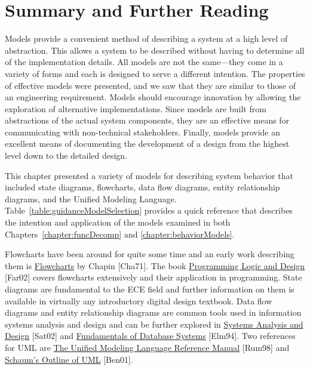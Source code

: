 \section{Summary and Further Reading}
\label{section:behavModelsSummary-and-further-reading}

Models provide a convenient method of describing a system at a high
level of abstraction. This allows a system to be described without
having to determine all of the implementation details. All models are
not the same---they come in a variety of forms and each is designed to
serve a different intention. The properties of effective models were
presented, and we saw that they are similar to those of an engineering
requirement. Models should encourage innovation by allowing the
exploration of alternative implementations. Since models are built from
abstractions of the actual system components, they are an effective
means for communicating with non-technical stakeholders. Finally, models
provide an excellent means of documenting the development of a design
from the highest level down to the detailed design.

This chapter presented a variety of models for describing system
behavior that included state diagrams, flowcharts, data flow diagrams,
entity relationship diagrams, and the Unified Modeling Language. 
Table~\ref{table:guidanceModelSelection}
provides a quick reference that describes the intention and
application of the models examined in both 
Chapters~\ref{chapter:funcDecomp} and \ref{chapter:behaviorModels}.

Flowcharts have been around for quite some time and an early work
describing them is \ul{Flowcharts} by Chapin {[}Cha71{]}. The book
\ul{Programming Logic and Design} {[}Far02{]} covers flowcharts
extensively and their application in programming. State diagrams are
fundamental to the ECE field and further information on them is
available in virtually any introductory digital design textbook. Data
flow diagrams and entity relationship diagrams are common tools used in
information systems analysis and design and can be further explored in
\ul{Systems Analysis and Design} {[}Sat02{]} and \ul{Fundamentals of
Database Systems} {[}Elm94{]}. Two references for UML are \ul{The
Unified Modeling Language Reference Manual} {[}Rum98{]} and \\
\ul{Schaum's Outline of UML} {[}Ben01{]}.
